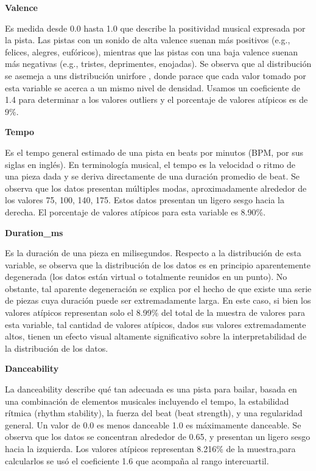 \documentclass[
  letterpaper,
  DIV=11,
  numbers=noendperiod]{scrartcl}
\begin{document}
\textbf{Valence}

Es medida desde 0.0 hasta 1.0 que describe la positividad musical
expresada por la pista. Las pistas con un sonido de alta valence suenan
más positivos (e.g., felices, alegres, eufóricos), mientras que las
pistas con una baja valence suenan más negativas (e.g., tristes,
deprimentes, enojadas). Se observa que al distribución se asemeja a uns
distribución unirfore , donde parace que cada valor tomado por esta
variable se acerca a un mismo nivel de densidad. Usamos un coeficiente
de 1.4 para determinar a los valores outliers y el porcentaje de valores
atípicos es de 9\%.

\textbf{Tempo}

Es el tempo general estimado de una pista en beats por minutos (BPM, por
sus siglas en inglés). En terminología musical, el tempo es la velocidad
o ritmo de una pieza dada y se deriva directamente de una duración
promedio de beat. Se observa que los datos presentan múltiples modas,
aproximadamente alrededor de los valores 75, 100, 140, 175. Estos datos
presentan un ligero sesgo hacia la derecha. El porcentaje de valores
atípicos para esta variable es 8.90\%.

\textbf{Duration\_ms}

Es la duración de una pieza en milisegundos. Respecto a la distribución
de esta variable, se observa que la distribución de los datos es en
principio aparentemente degenerada (los datos están virtual o totalmente
reunidos en un punto). No obstante, tal aparente degeneración se explica
por el hecho de que existe una serie de piezas cuya duración puede ser
extremadamente larga. En este caso, si bien los valores atípicos
representan solo el 8.99\% del total de la muestra de valores para esta
variable, tal cantidad de valores atípicos, dados sus valores
extremadamente altos, tienen un efecto visual altamente significativo
sobre la interpretabilidad de la distribución de los datos.

\textbf{Danceability}

La danceability describe qué tan adecuada es una pista para bailar,
basada en una combinación de elementos musicales incluyendo el tempo, la
estabilidad rítmica (rhythm stability), la fuerza del beat (beat
strength), y una regularidad general. Un valor de 0.0 es menos danceable
1.0 es máximamente danceable. Se observa que los datos se concentran
alrededor de 0.65, y presentan un ligero sesgo hacia la izquierda. Los
valores atípicos representan 8.216\% de la muestra,para calcularlos se
usó el coeficiente 1.6 que acompaña al rango intercuartil.
\end{document}
